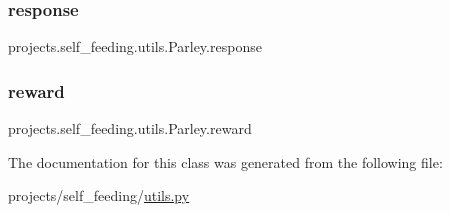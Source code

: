 \subsubsection{\texorpdfstring{response}{response}}
{\footnotesize\ttfamily projects.\+self\+\_\+feeding.\+utils.\+Parley.\+response}

\mbox{\label{classprojects_1_1self__feeding_1_1utils_1_1Parley_a19499f2c53886bc11c811a17acca012d}} 
\subsubsection{\texorpdfstring{reward}{reward}}
{\footnotesize\ttfamily projects.\+self\+\_\+feeding.\+utils.\+Parley.\+reward}



The documentation for this class was generated from the following file\+:\begin{DoxyCompactItemize}
\item 
projects/self\+\_\+feeding/\hyperlink{projects_2self__feeding_2utils_8py}{utils.\+py}\end{DoxyCompactItemize}
